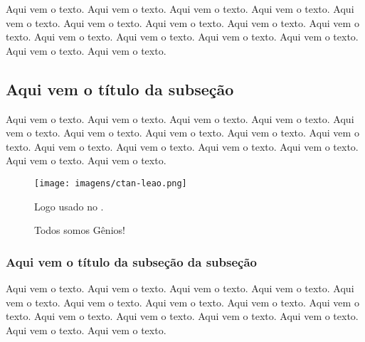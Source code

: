 \documentclass[a4paper, 12pt]{article}
\begin{document}
Aqui vem o texto. Aqui vem o texto. Aqui vem o texto. Aqui vem o texto. Aqui vem o texto. Aqui vem o texto. Aqui vem o texto. Aqui vem o texto. Aqui vem o texto. Aqui vem o texto. Aqui vem o texto. Aqui vem o texto. Aqui vem o texto. Aqui vem o texto. Aqui vem o texto.

\subsection{Aqui vem o título da subseção}

Aqui vem o texto. Aqui vem o texto. Aqui vem o texto. Aqui vem o texto. Aqui vem o texto. Aqui vem o texto. Aqui vem o texto. Aqui vem o texto. Aqui vem o texto. Aqui vem o texto. Aqui vem o texto. Aqui vem o texto. Aqui vem o texto. Aqui vem o texto. Aqui vem o texto.

\begin{figure}[htb]
\cetering
\texttt{[image: imagens/ctan-leao.png]}
\caption{Logo usado no \LaTex.}
\caption{Todos somos Gênios!}
\label{figura-leao}
\end{figure}

\subsubsection{Aqui vem o título da subseção da subseção}

Aqui vem o texto. Aqui vem o texto. Aqui vem o texto. Aqui vem o texto. Aqui vem o texto. Aqui vem o texto. Aqui vem o texto. Aqui vem o texto. Aqui vem o texto. Aqui vem o texto. Aqui vem o texto. Aqui vem o texto. Aqui vem o texto. Aqui vem o texto. Aqui vem o texto.  

 

 
\end{document}
